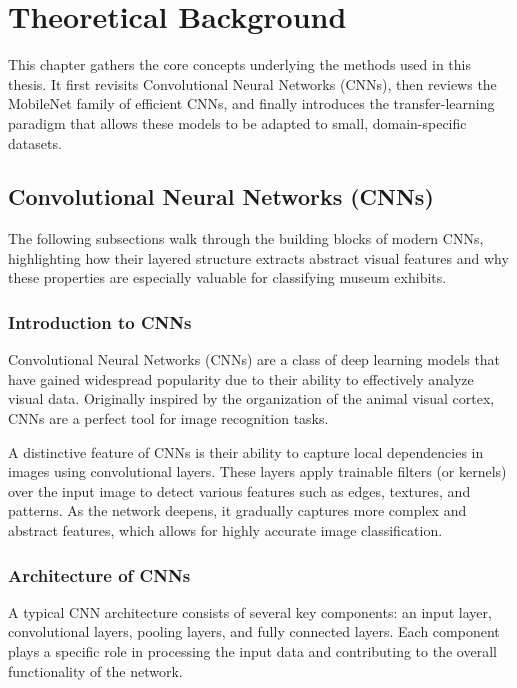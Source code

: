 \chapter{Theoretical Background}

This chapter gathers the core concepts underlying the methods used in this thesis. It first revisits Convolutional Neural Networks (CNNs), then reviews the MobileNet family of efficient CNNs, and finally introduces the transfer-learning paradigm that allows these models to be adapted to small, domain-specific datasets.

\section{Convolutional Neural Networks (CNNs)}

The following subsections walk through the building blocks of modern CNNs, highlighting how their layered structure extracts abstract visual features and why these properties are especially valuable for classifying museum exhibits.

\subsection{Introduction to CNNs}

Convolutional Neural Networks (CNNs) are a class of deep learning models that have gained widespread popularity due to their ability to effectively analyze visual data. Originally inspired by the organization of the animal visual cortex, CNNs are a perfect tool for image recognition tasks.

A distinctive feature of CNNs is their ability to capture local dependencies in images using convolutional layers. These layers apply trainable filters (or kernels) over the input image to detect various features such as edges, textures, and patterns. As the network deepens, it gradually captures more complex and abstract features, which allows for highly accurate image classification.

\subsection{Architecture of CNNs}

A typical CNN architecture consists of several key components: an input layer, convolutional layers, pooling layers, and fully connected layers. Each component plays a specific role in processing the input data and contributing to the overall functionality of the network.

